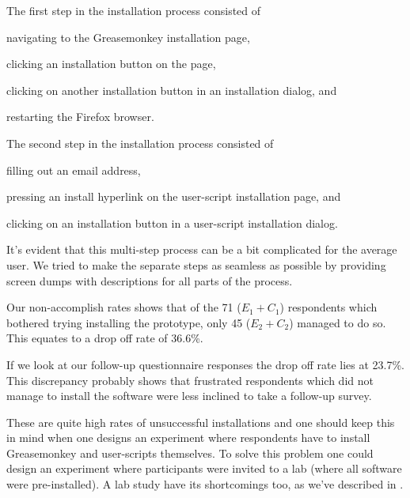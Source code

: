 The first step in the installation process consisted of
\begin{inparaenum}[(i)]
  \item navigating to the Greasemonkey installation page,
  \item clicking an installation button on the page,
  \item clicking on another installation button in an installation
    dialog, and
  \item restarting the Firefox browser.
\end{inparaenum}
The second step in the installation process consisted of
\begin{inparaenum}[(i)]
  \item filling out an email address,%
  \item pressing an install hyperlink on the user-script installation page,
    and
  \item clicking on an installation button in a user-script installation
    dialog.
\end{inparaenum}
It's evident that this multi-step process can be a bit complicated for the
average user. We tried to make the separate steps as seamless as possible
by providing screen dumps with descriptions for all parts of the process.

Our non-accomplish rates%
shows that of the 71 ($E_1 + C_1$) respondents which bothered trying
installing the prototype, only 45 ($E_2 + C_2$) managed to do so. This equates
to a drop off rate of 36.6\%.

If we look at our follow-up questionnaire responses%
the drop off rate lies at 23.7\%. This discrepancy probably shows that
frustrated respondents which did not manage to install the software were less
inclined to take a follow-up survey.

These are quite high rates of unsuccessful
installations and one should keep this in mind when one designs an
experiment where respondents have to install Greasemonkey and user-scripts
themselves. To solve this problem one could design an experiment where
participants were invited to a lab (where all software were pre-installed). A
lab study have its shortcomings too, as we've described in
.

